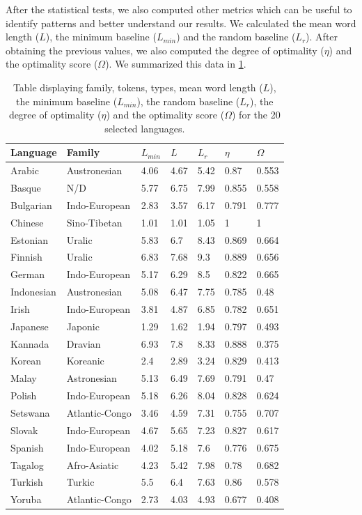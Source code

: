 \newpage
After the statistical tests, we also computed other metrics which can be useful to identify patterns and better understand our results. We calculated the mean word length ($L$), the minimum baseline ($L_{min}$) and the random baseline ($L_r$). After obtaining the previous values, we also computed the degree of optimality ($\eta$) and the optimality score ($\Omega$). We summarized this data in \cref{table2}.

\begin{table}[]
\begin{tabular}{lllllll}
Language   & Family         & $L_{min}$ & $L$    & $L_r$   & $\eta$     & $\Omega$     \\ \hline
Arabic     & Austronesian   & 4.06 & 4.67 & 5.42 & 0.87  & 0.553 \\
Basque     & N/D            & 5.77 & 6.75 & 7.99 & 0.855 & 0.558 \\
Bulgarian  & Indo-European  & 2.83 & 3.57 & 6.17 & 0.791 & 0.777 \\
Chinese    & Sino-Tibetan   & 1.01 & 1.01 & 1.05 & 1     & 1     \\
Estonian   & Uralic         & 5.83 & 6.7  & 8.43 & 0.869 & 0.664 \\
Finnish    & Uralic         & 6.83 & 7.68 & 9.3  & 0.889 & 0.656 \\
German     & Indo-European  & 5.17 & 6.29 & 8.5  & 0.822 & 0.665 \\
Indonesian & Austronesian   & 5.08 & 6.47 & 7.75 & 0.785 & 0.48  \\
Irish      & Indo-European  & 3.81 & 4.87 & 6.85 & 0.782 & 0.651 \\
Japanese   & Japonic        & 1.29 & 1.62 & 1.94 & 0.797 & 0.493 \\
Kannada    & Dravian        & 6.93 & 7.8  & 8.33 & 0.888 & 0.375 \\
Korean     & Koreanic       & 2.4  & 2.89 & 3.24 & 0.829 & 0.413 \\
Malay      & Astronesian    & 5.13 & 6.49 & 7.69 & 0.791 & 0.47  \\
Polish     & Indo-European  & 5.18 & 6.26 & 8.04 & 0.828 & 0.624 \\
Setswana   & Atlantic-Congo & 3.46 & 4.59 & 7.31 & 0.755 & 0.707 \\
Slovak     & Indo-European  & 4.67 & 5.65 & 7.23 & 0.827 & 0.617 \\
Spanish    & Indo-European  & 4.02 & 5.18 & 7.6  & 0.776 & 0.675 \\
Tagalog    & Afro-Asiatic   & 4.23 & 5.42 & 7.98 & 0.78  & 0.682 \\
Turkish    & Turkic         & 5.5  & 6.4  & 7.63 & 0.86  & 0.578 \\
Yoruba     & Atlantic-Congo & 2.73 & 4.03 & 4.93 & 0.677 & 0.408
\end{tabular}
\caption{Table displaying family, tokens, types, mean word length ($L$), the minimum baseline ($L_{min}$), the random baseline ($L_r$), the degree of optimality ($\eta$) and the optimality score ($\Omega$) for the 20 selected languages.}
\label{table2}
\end{table}

